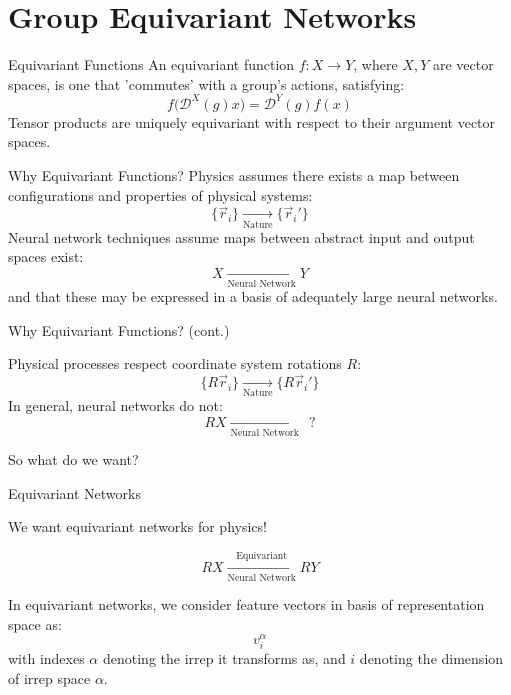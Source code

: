 \documentclass[11pt]{beamer}
\begin{document}
\section{Group Equivariant Networks}
\begin{frame}{Equivariant Functions}
	An equivariant function $f:X\rightarrow Y$, where $X,Y$ are vector spaces, is one that 'commutes' with a group's actions, satisfying:
	$$
	f\Big(\mathcal{D}^X(g)x\Big)=\mathcal{D}^Y(g)f(x)
	$$
	Tensor products are uniquely equivariant with respect to their argument vector spaces.
\end{frame}
\begin{frame}{Why Equivariant Functions?}
	Physics assumes there exists a map between configurations and properties of physical systems: 
	$$
	  \lbrace\vec{r}_i \rbrace \xrightarrow[\text{Nature}]{}
	  \lbrace\vec{r}_i' \rbrace
	$$
	Neural network techniques assume maps between abstract input and output spaces exist:
	$$
	X
	\xrightarrow[\text{Neural Network}]{}
	Y
	$$
	and that these may be expressed in a basis of adequately large neural networks.
\end{frame}
\begin{frame}{Why Equivariant Functions? (cont.)}
	\begin{center}
	Physical processes respect coordinate system rotations $R$:
	$$
	\lbrace R\vec{r}_i \rbrace \xrightarrow[\text{Nature}]{}
	\lbrace R\vec{r}_i' \rbrace
	$$
	In general, neural networks do not:
	$$
	RX
	\xrightarrow[\text{Neural Network}]{} \ \ 
	?
	$$
	
	So what do we want?

	\end{center}
\end{frame}
\begin{frame}{Equivariant Networks}
\begin{center}
We want equivariant networks for physics!

	$$
	RX
	\xrightarrow[\text{Neural Network}]{\text{Equivariant}} RY
	$$
	
\vspace{0.6cm}

\end{center}
	
In equivariant networks, we consider feature vectors in basis of representation space as:
$$
v^{\alpha}_i
$$
with indexes $\alpha$ denoting the irrep it transforms as, and $i$ denoting the dimension of irrep space $\alpha$.
\end{frame}
\end{document}
